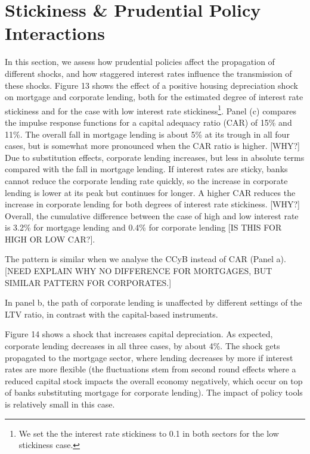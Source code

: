 \documentclass[12pt]{article}
\numberwithin{equation}{section}
\begin{document}
\section*{Stickiness \& Prudential Policy Interactions}





In this section, we assess how prudential policies affect the propagation of different shocks, and how staggered interest rates influence the transmission of these shocks. Figure 13 shows the effect of a positive housing depreciation shock on mortgage and corporate lending, both for the estimated degree of interest rate stickiness and for the case with low interest rate stickiness\footnote{We set the the interest rate stickiness to 0.1 in both sectors for the low stickiness case.}. Panel (c) compares the impulse response functions for a capital adequacy ratio (CAR) of 15\% and 11\%.  The overall fall in mortgage lending is about 5\% at its trough in all four cases, but is somewhat more pronounced when the CAR ratio is higher. [WHY?] Due to substitution effects, corporate lending increases, but less in absolute terms compared with the fall in mortgage lending. If interest rates are sticky, banks cannot reduce the corporate lending rate quickly, so the increase in corporate lending is lower at its peak but continues for longer. A higher CAR reduces the increase in corporate lending for both degrees of interest rate stickiness. [WHY?] Overall, the cumulative difference between the case of high and low interest rate is 3.2\% for mortgage lending and 0.4\% for corporate lending [IS THIS FOR HIGH OR LOW CAR?].

The pattern is similar when we analyse the CCyB instead of CAR (Panel a). [NEED EXPLAIN WHY NO DIFFERENCE FOR MORTGAGES, BUT SIMILAR PATTERN FOR CORPORATES.]

In panel b, the path of corporate lending is unaffected by different settings of the LTV ratio, in contrast with the capital-based instruments.

Figure 14 shows a shock that increases capital depreciation. As expected, corporate lending decreases in all three cases, by about 4\%. The shock gets propagated to the mortgage sector, where lending decreases by more if interest rates are more flexible (the fluctuations stem from second round effects where a reduced capital stock impacts the overall economy negatively, which occur on top of banks substituting mortgage for corporate lending). The impact of policy tools is relatively small in this case.
\end{document}
